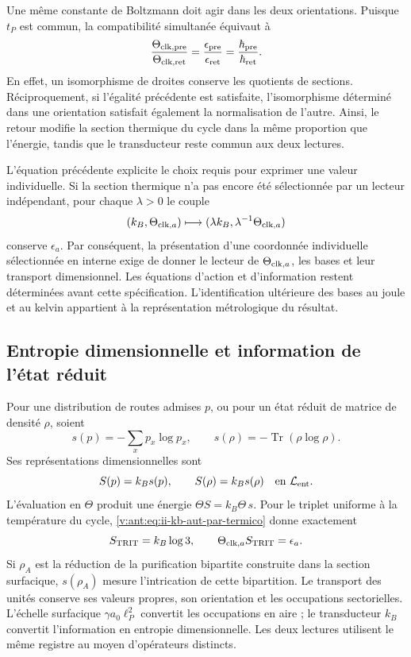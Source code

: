 Une même constante de Boltzmann doit agir dans les deux orientations.
Puisque \(t_P\) est commun, la compatibilité simultanée équivaut à
\begin{equation}
 \frac{\Theta_{{\rm clk},{\rm pre}}}{\Theta_{{\rm clk},{\rm ret}}}
 =\frac{\epsilon_{\rm pre}}{\epsilon_{\rm ret}}
 =\frac{\hbar_{\rm pre}}{\hbar_{\rm ret}}.
 \label{v:ant:eq:ii-kb-aut-orientaciones}
\end{equation}
En effet, un isomorphisme de droites conserve les quotients de sections. Réciproquement, si l'égalité précédente est satisfaite, l'isomorphisme déterminé dans une orientation satisfait également la normalisation de l'autre. Ainsi, le retour modifie la section thermique du cycle dans la même proportion que l'énergie, tandis que le transducteur reste commun aux deux lectures.

L’équation précédente explicite le choix requis pour exprimer une
valeur individuelle. Si la section thermique n’a pas encore été sélectionnée
par un lecteur indépendant, pour chaque \(\lambda>0\) le couple
\[
 (k_B,\Theta_{{\rm clk},a})
 \longmapsto(\lambda k_B,\lambda^{-1}\Theta_{{\rm clk},a})
\]
conserve \(\epsilon_a\). Par conséquent, la présentation d’une
coordonnée individuelle sélectionnée en interne exige de donner le lecteur de
\(\Theta_{{\rm clk},a}\), les bases et leur transport dimensionnel.
Les équations d’action et d’information restent déterminées avant
cette spécification. L’identification ultérieure des bases au
joule et au kelvin appartient à la représentation métrologique du résultat.

\subsection{Entropie dimensionnelle et information de l'état réduit}

Pour une distribution de routes admises \(p\), ou pour un état réduit de matrice de densité \(\rho\), soient
\[
 s(p)=-\sum_xp_x\log p_x,\qquad
 s(\rho)=-\operatorname{Tr}(\rho\log\rho).
\]
Ses représentations dimensionnelles sont
\begin{equation}
 S(p)=k_Bs(p),\qquad S(\rho)=k_Bs(\rho)
 \quad\text{en }\mathcal L_{\rm ent}.
 \label{v:ant:eq:ii-kb-aut-entropia}
\end{equation}
L'évaluation en \(\Theta\) produit une énergie
\(\Theta S=k_B\Theta\,s\). Pour le triplet uniforme à la température
du cycle, \eqref{v:ant:eq:ii-kb-aut-par-termico} donne exactement
\[
 S_{\rm TRIT}=k_B\log3,\qquad
 \Theta_{{\rm clk},a}S_{\rm TRIT}=\epsilon_a.
\]
Si \(\rho_A\) est la réduction de la purification bipartite construite dans la section surfacique, \(s(\rho_A)\) mesure l'intrication de cette bipartition. Le transport des unités conserve ses valeurs propres, son orientation et les occupations sectorielles. L'échelle surfacique \(\gamma a_0\ell_P^2\) convertit les occupations en aire ; le transducteur \(k_B\) convertit l'information en entropie dimensionnelle. Les deux lectures utilisent le même registre au moyen d'opérateurs distincts.


